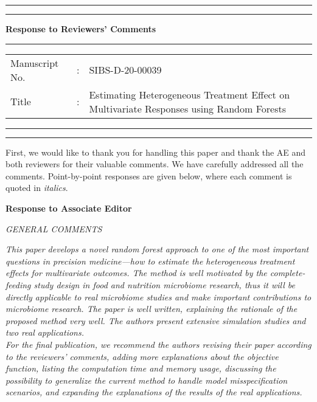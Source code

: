 \documentclass[11pt]{article}
\begin{document}
\hrule
\vspace*{0.02cm}
\hrule
\vspace*{1cm}
{\Large \bf Response to Reviewers' Comments}
\vspace*{1cm}
\hrule
\vspace*{0.5cm}
\begin{tabular}{llp{11.5cm}}
Manuscript No. & : & SIBS-D-20-00039 \\
Title & : & Estimating Heterogeneous Treatment Effect on Multivariate Responses using Random Forests\\
\end{tabular}
\vspace*{0.5cm}
\hrule
\vspace*{0.02cm}
\hrule

\vspace*{1cm}

First, we would like to thank you for handling this paper and thank the AE and both reviewers for their valuable comments. We have carefully addressed all the comments. Point-by-point responses are given below, where each comment is quoted in {\em italics}.

\bigskip

{\bf Response to Associate Editor}

{\em GENERAL COMMENTS}

{\em This paper develops a novel random forest approach to one of the most important questions in precision medicine—how to estimate the heterogeneous treatment effects for multivariate outcomes. The method is well motivated by the complete-feeding study design in food and nutrition microbiome research, thus it will be directly applicable to real microbiome studies and make important contributions to microbiome research. The paper is well written, explaining the rationale of the proposed method very well. The authors present extensive simulation studies and two real applications.\\

For the final publication, we recommend the authors revising their paper according to the reviewers’ comments, adding more explanations about the objective function, listing the computation time and memory usage, discussing the possibility to generalize the current method to handle model misspecification scenarios, and expanding the explanations of the results of the real applications.
}
\end{document}

